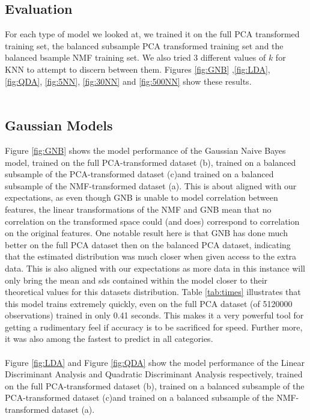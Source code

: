 \documentclass{article}
\newcommand{\PCAF}{(b)}
\newcommand{\PCAB}{(c)}
\newcommand{\NMFB}{(a)}
\begin{document}
\begin{multicols}{2}
\subsection{Evaluation}
For each type of model we looked at, we trained it on the full PCA transformed training set, the balanced subsample PCA transformed training set and the balanced bsample NMF training set. We also tried 3 different values of $k$ for KNN to attempt to discern between them. Figures \ref{fig:GNB} ,\ref{fig:LDA}, \ref{fig:QDA}, \ref{fig:5NN}, \ref{fig:30NN} and \ref{fig:500NN} show these results.
\\\\
\subsection{Gaussian Models}
Figure \ref{fig:GNB} shows the model performance of the Gaussian Naive Bayes model, trained on the full PCA-transformed dataset \PCAF, trained on a balanced subsample of the PCA-transformed dataset \PCAB and trained on a balanced subsample of the NMF-transformed dataset \NMFB.
This is about aligned with our expectations, as even though GNB is unable to model correlation between features, the linear transformations of the NMF and GNB mean that no correlation on the transformed space could (and does) correspond to correlation on the original features.
One notable result here is that GNB has done much better on the full PCA dataset then on the balanced PCA dataset, indicating that the estimated distribution was much closer when given access to the extra data. This is also aligned with our expectations as more data in this instance will only bring the mean and sds contained within the model closer to their theoretical values for this datasets distribution.
Table \ref{tab:times} illustrates that this model trains extremely quickly, even on the full PCA dataset (of 5120000 observations) trained in only 0.41 seconds. This makes it a very powerful tool for getting a rudimentary feel if accuracy is to be sacrificed for speed. Further more, it was also among the fastest to predict in all categories.
\\\\
Figure \ref{fig:LDA} and Figure \ref{fig:QDA} show the model performance of the Linear Discriminant Analysis and Quadratic Discriminant Analysis respectively, trained on the full PCA-transformed dataset \PCAF, trained on a balanced subsample of the PCA-transformed dataset \PCAB and trained on a balanced subsample of the NMF-transformed dataset \NMFB. 

\end{multicols}
\end{document}
